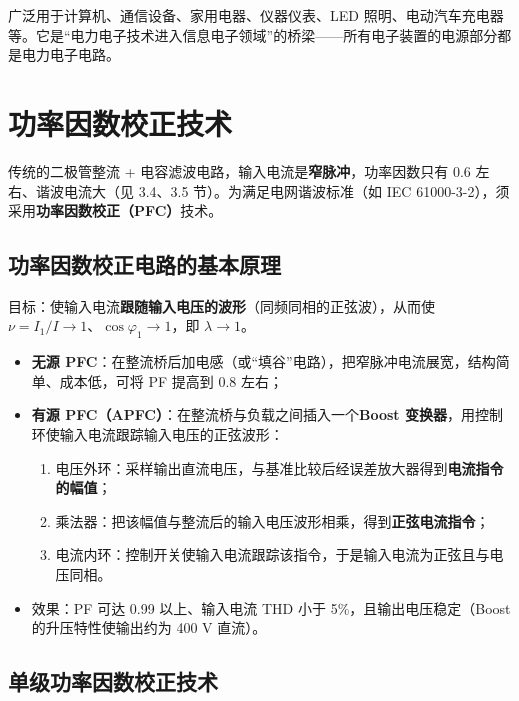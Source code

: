 广泛用于计算机、通信设备、家用电器、仪器仪表、LED 照明、电动汽车充电器等。它是“电力电子技术进入信息电子领域”的桥梁——所有电子装置的电源部分都是电力电子电路。

\section{功率因数校正技术}

传统的二极管整流 + 电容滤波电路，输入电流是\textbf{窄脉冲}，功率因数只有 0.6 左右、谐波电流大（见 3.4、3.5 节）。为满足电网谐波标准（如 IEC 61000-3-2），须采用\textbf{功率因数校正（PFC）}技术。

\subsection{功率因数校正电路的基本原理}

目标：使输入电流\textbf{跟随输入电压的波形}（同频同相的正弦波），从而使 $\nu=I_1/I\to1$、$\cos\varphi_1\to1$，即 $\lambda\to1$。

\begin{itemize}
  \item \textbf{无源 PFC}：在整流桥后加电感（或“填谷”电路），把窄脉冲电流展宽，结构简单、成本低，可将 PF 提高到 0.8 左右；
  \item \textbf{有源 PFC（APFC）}：在整流桥与负载之间插入一个\textbf{Boost 变换器}，用控制环使输入电流跟踪输入电压的正弦波形：
  \begin{enumerate}
    \item 电压外环：采样输出直流电压，与基准比较后经误差放大器得到\textbf{电流指令的幅值}；
    \item 乘法器：把该幅值与整流后的输入电压波形相乘，得到\textbf{正弦电流指令}；
    \item 电流内环：控制开关使输入电流跟踪该指令，于是输入电流为正弦且与电压同相。
  \end{enumerate}
  \item 效果：PF 可达 0.99 以上、输入电流 THD 小于 5\%，且输出电压稳定（Boost 的升压特性使输出约为 400 V 直流）。
\end{itemize}


\subsection{单级功率因数校正技术}


